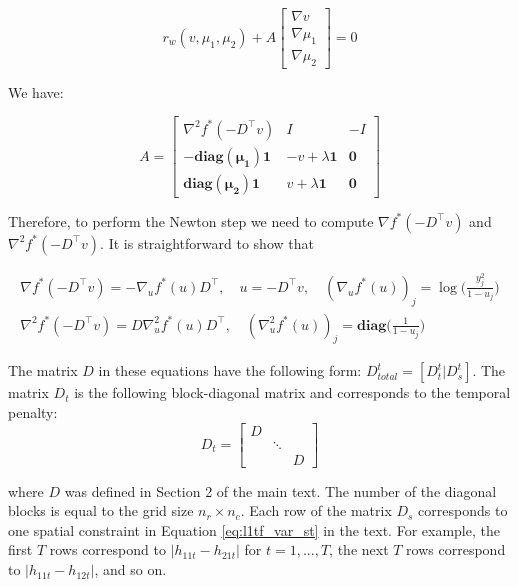 \documentclass{article}
\newcommand{\one}{\mathbf{1}}
\begin{document}
\begin{equation}
r_w(v,\mu_1,\mu_2)+A
\begin{bmatrix}
	\nabla v\\
	\nabla \mu_1\\
	\nabla \mu_2	
	\end{bmatrix}= 0
\label{eq:newton_step}
\end{equation}


We have:

\begin{equation}
A=
\begin{bmatrix}
	\nabla^2 f^*(-D^\top v) & I & -I\\
	-\mathbf{diag(\mu_1)}\one & -v+\lambda\one & \mathbf{0}\\
	\mathbf{diag(\mu_2)}\one & v+\lambda\one & \mathbf{0}
	\end{bmatrix}
\label{eq:delta_r}
\end{equation}

Therefore, to perform the Newton step we need to compute $\nabla f^*(-D^\top v)$ and $\nabla^2 f^*(-D^\top v)$. It is straightforward to show that

\begin{align}
\nabla f^*(-D^\top v) = -\nabla_u f^*(u) D^\top ,\quad u=-D^\top v, \quad (\nabla_u f^*(u))_j=\log\bigg(\frac{y_j^2}{1-u_j}\bigg) \\
\nabla^2 f^*(-D^\top v)=D\nabla_u^2 f^*(u)D^\top, \quad (\nabla_u^2 f^*(u))_j=\mathbf{diag}\bigg(\frac{1}{1-u_j}\bigg)
\end{align}

The matrix $D$ in these equations have the following form:  $D_{total}^t=[D_{t}^t|D_{s}^t]$. The matrix $D_t$ is the following block-diagonal matrix and corresponds to the temporal penalty: 
 \begin{equation}
 D_t=\begin{bmatrix}
 D &  & \\ 
  & \ddots & \\
  &  & D
 \end{bmatrix}
 \label{eq:d_t_matrix}
 \end{equation}

where $D$ was defined in Section 2 of the main text. The number of the diagonal blocks is equal to the grid size $n_r \times n_c$. Each row of the matrix $D_s$ corresponds to one spatial constraint in Equation \eqref{eq:l1tf_var_st} in the text. For example, the first $T$ rows correspond to $|h_{11t}-h_{21t}|$ for $t=1,...,T$, the next $T$ rows correspond to $|h_{11t}-h_{12t}|$, and so on. 
\end{document}
